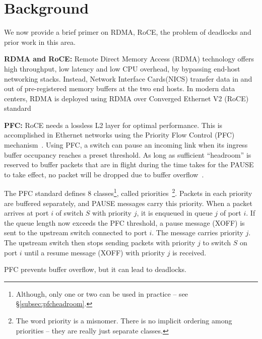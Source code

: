 \section{Background}
\label{sec:background}

We now provide a brief primer on RDMA, RoCE, the problem of deadlocks and prior
work in this area.

{\bf RDMA and RoCE:} Remote Direct Memory Access (RDMA) technology offers high
throughput, low latency and low CPU overhead, by bypassing end-host networking
stacks. Instead, Network Interface Cards(NICS) transfer data in and out of
pre-registered memory buffers at the two end hosts.  In modern data centers,
RDMA is deployed using RDMA over Converged Ethernet V2 (RoCE)
standard~\cite{roce,rroce}

{\bf PFC:} RoCE needs a lossless L2 layer for optimal performance. This is
accomplished in Ethernet networks using the Priority Flow Control (PFC)
mechanism~\cite{pfc}.  Using PFC, a switch can pause an incoming link when its
ingress buffer occupancy reaches a preset threshold. As long as sufficient
``headroom'' is reserved to buffer packets that are in flight during the time
takes for the PAUSE to take effect, no packet will be dropped due to buffer
overflow~\cite{cisco-whitepaper,dcqcn}. 

The PFC standard defines 8 classes\footnote{Although, only one or two can be
used in practice -- see \S\ref{subsec:pfcheadroom}.}, called priorities~\footnote{The word priority is a
misnomer. There is no implicit ordering among priorities -- they are really just
separate classes.}. Packets in each priority are buffered separately, and PAUSE
messages carry this priority.  When a packet arrives at port $i$ of switch $S$
with priority $j$, it is enqueued in queue $j$ of port $i$. If the queue length
now exceeds the PFC threshold, a pause message (XOFF) is sent to the upstream
switch connected to port $i$. The message carries priority $j$. The upstream
switch then stops sending packets with priority $j$ to switch $S$ on port $i$ until a resume
message (XOFF) with priority $j$ is received.

PFC prevents buffer overflow, but it can lead to deadlocks.


